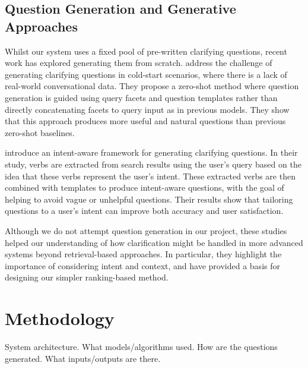 \documentclass[11pt]{article}
\begin{document}
\subsection{Question Generation and Generative Approaches}
Whilst our system uses a fixed pool of pre-written clarifying questions, recent work has explored generating them from scratch. \citet{Wang2023} address the challenge of generating clarifying questions in cold-start scenarios, where there is a lack of real-world conversational data. They propose a zero-shot method where question generation is guided using query facets and question templates rather than directly concatenating facets to query input as in previous models. They show that this approach produces more useful and natural questions than previous zero-shot baselines.

\citet{Zhao2024} introduce an intent-aware framework for generating clarifying questions. In their study, verbs are extracted from search results using the user's query based on the idea that these verbs represent the user's intent. These extracted verbs are then combined with templates to produce intent-aware questions, with the goal of helping to avoid vague or unhelpful questions. Their results show that tailoring questions to a user's intent can improve both accuracy and user satisfaction.

Although we do not attempt question generation in our project, these studies helped our understanding of how clarification might be handled in more advanced systems beyond retrieval-based approaches. In particular, they highlight the importance of considering intent and context, and have provided a basis for designing our simpler ranking-based method.

\section{Methodology}
System architecture.
What models/algorithms used.
How are the questions generated.
What inputs/outputs are there.

\cite{Aliannejadi2019}
\end{document}
